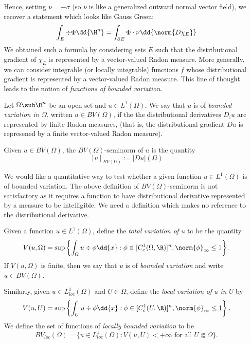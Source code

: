 \documentclass[../main.tex]{subfiles}
\begin{document}
Hence, setting $ \nu = -\sigma $ (so $ \nu $ is like a generalized outward normal vector field), we recover a statement which looks like Gauss Green:
\[
    \int_{E} \div{\Phi} \dd{\H^{n}} = \int_{\partial E} \Phi\cdot \nu\dd{\norm{D \chi_{E}}}
\]
We obtained such a formula by considering sets $ E $ such that the distributional gradient of $ \chi_{E} $  is represented by a vector-valued Radon measure. More generally, we can consider integrable (or locally integrable) functions $ f $ whose distributional gradient is represented by a vector-valued Radon measure. This line of thought leads to the notion of \textit{functions of bounded variation}.

\begin{definition}\label{def:BV}
    Let $ \Omega\sub \R^{n} $ be an open set and $ u\in L^{1}(\Omega) $. We say that $ u $ is of \textit{bounded variation in $\Omega$}, written $ u\in BV(\Omega) $, if the the distributional derivatives $ D_{i}u $ are represented by finite Radon measures, (that is, the distributional gradient $ Du $ is represened by a finite vector-valued Radon measure).

    Given $ u\in BV(\Omega) $, the $ BV(\Omega) $-seminorm of $ u $ is the quantity 
    \[
        [u]_{BV(\Omega)} := |Du|(\Omega)
    \]
\end{definition}


We would like a quantitative way to test whether a given function $ u\in L^{1}(\Omega) $ is of bounded variation. The above definition of $ BV(\Omega) $-seminorm is not satisfactory as it requires a function to have distributional derivative represented by a measure to be intelligible. We need a definition which makes no reference to the distributional derivative.




\begin{definition}Given a function $ u\in L^{1}(\Omega) $, define the \textit{total variation of $ u $} to be the quantity
    \[
        V(u,\Omega) = \sup\left\{ \int_{\Omega} u\div{\phi}\dd{x} : \phi\in[C_{c}^{1}(\Omega,\R)]^{n}, \norm{\phi}_{\infty} \leq 1 \right\}.
    \]
    If $ V(u,\Omega) $ is finite, then we say that $ u $ is of \textit{bounded variation} and write $ u\in BV(\Omega) $. 
\end{definition}

\begin{definition}    Similarly, given $ u\in L^{1}_{loc}(\Omega) $ and $ U\Subset \Omega $, define the \textit{local variation of $ u $ in $ U $} by
    \[
        V(u, U) = \sup\left\{ \int_{U} u\div{\phi}\dd{x} : \phi\in[C_{c}^{1}(U,\R)]^{n}, \norm{\phi}_{\infty} \leq 1 \right\}.
    \]
    We define the set of functions of \textit{locally bounded variation} to be
    \[
        BV_{loc}(\Omega) = \{u\in L^{1}_{loc}(\Omega) : V(u,U)< +\infty \text{ for all } U\Subset \Omega\}.
    \]
\end{definition}
\end{document}
